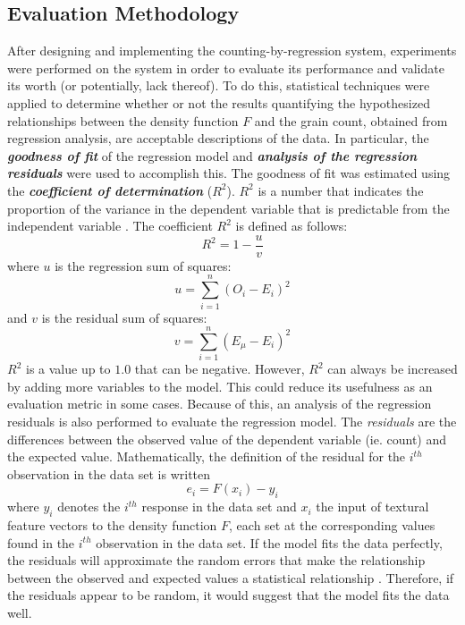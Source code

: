 \subsection{Evaluation Methodology}
After designing and implementing the counting-by-regression system, experiments were performed on the system in order to evaluate its performance and validate its worth (or potentially, lack thereof). To do this, statistical techniques were applied to determine whether or not the results quantifying the hypothesized relationships between the density function $F$ and the grain count, obtained from regression analysis, are acceptable descriptions of the data. In particular, the \textit{\textbf{goodness of fit}} of the regression model and \textit{\textbf{analysis of the regression residuals}} were used to accomplish this. The goodness of fit was estimated using the \textbf{\textit{coefficient of determination}} ($R^2$). $R^2$ is a number that indicates the proportion of the variance in the dependent variable that is predictable from the independent variable \cite{REF31}. The coefficient $R^2$ is defined as follows:
\begin{equation}
R^2 = 1 - \frac{u}{v}
\end{equation}
where $u$ is the regression sum of squares:
\begin{equation}
u = \sum_{i = 1}^{n} (O_i - E_i)^2 
\end{equation}
and $v$ is the residual sum of squares:
\begin{equation}
v = \sum_{i = 1}^{n} (E_\mu - E_i)^2 
\end{equation}
$R^2$ is a value up to $1.0$ that can be negative. However, $R^2$ can always be increased by adding more variables to the model. This could reduce its usefulness as an evaluation metric in some cases. Because of this, an analysis of the regression residuals is also performed to evaluate the regression model. The \textit{residuals} are the differences between the observed value of the dependent variable (ie. count) and the expected value. Mathematically, the definition of the residual for the $i^{th}$ observation in the data set is written
\begin{equation}
e_i = F(x_i) - y_i 
\end{equation}
where $y_i$ denotes the $i^{th}$ response in the data set and $x_i$ the input of textural feature vectors to the density function $F$, each set at the corresponding values found in the $i^{th}$ observation in the data set. If the model fits the data perfectly, the residuals will approximate the random errors that make the relationship between the observed and expected values a statistical relationship \cite{REF32}. Therefore, if the residuals appear to be random, it would suggest that the model fits the data well.

